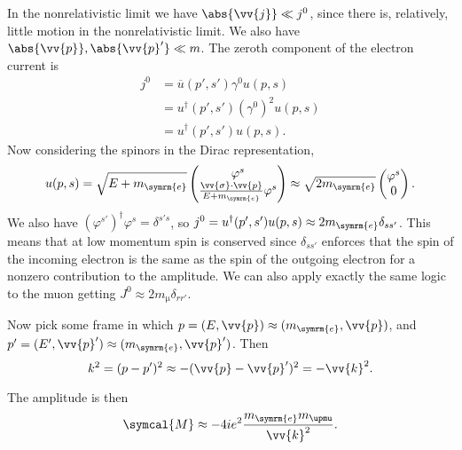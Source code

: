 \documentclass[fleqn]{NotesClass}
\newcommand{\hermit}{{\dagger}}
\newcommand{\amplitude}{\symcal{M}}
\newcommand{\diracadjoint}[1]{\overbar{#1}}
\begin{document}
    In the nonrelativistic limit we have \(\abs{\vv{j}} \ll j^0\), since there is, relatively, little motion in the nonrelativistic limit.
    We also have \(\abs{\vv{p}}, \abs{\vv{p}'} \ll m\).
    The zeroth component of the electron current is
    \begin{align}
        j^0 &= \diracadjoint{u}(p', s') \gamma^0 u(p, s)\\
        &= u^\hermit(p', s') (\gamma^0)^2 u(p, s)\\
        &= u^\hermit(p', s') u(p, s).
    \end{align}
    Now considering the spinors in the Dirac representation,
    \begin{equation}
        u(p, s) = \sqrt{E + m_{\symrm{e}}} 
        \begin{pmatrix}
            \varphi^s\\ \frac{\vv{\sigma} \cdot \vv{p}}{E + m_{\symrm{e}}} \varphi^s
        \end{pmatrix}
        \approx \sqrt{2m_{\symrm{e}}}
        \begin{pmatrix}
            \varphi^s\\ 0
        \end{pmatrix}
        .
    \end{equation}
    We also have \((\varphi^{s'})^\hermit \varphi^s = \delta^{s's}\), so \(j^0 = u^\hermit(p', s') u(p, s) \approx 2m_{\symrm{e}} \delta_{ss'}\).
    This means that at low momentum spin is conserved since \(\delta_{ss'}\) enforces that the spin of the incoming electron is the same as the spin of the outgoing electron for a nonzero contribution to the amplitude.
    We can also apply exactly the same logic to the muon getting \(J^0 \approx 2m_{\upmu} \delta_{rr'}\).
    
    Now pick some frame in which \(p = (E, \vv{p}) \approx (m_{\symrm{e}}, \vv{p})\), and \(p' = (E', \vv{p}') \approx (m_{\symrm{e}}, \vv{p}')\).
    Then
    \begin{equation}
        k^2 = (p - p')^2 \approx -(\vv{p} - \vv{p}')^2 = -\vv{k}^2.
    \end{equation}
    
    The amplitude is then
    \begin{equation}
        \amplitude \approx -4ie^2 \frac{m_{\symrm{e}}m_{\upmu}}{\vv{k}^2}.
    \end{equation}
    
\end{document}
